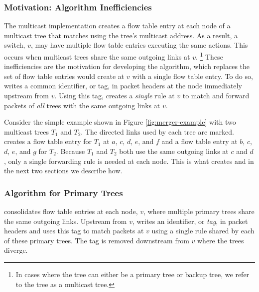 \subsubsection{Motivation: \basen Algorithm Inefficiencies}
\label{subsubsec:merge-motivate}

The \base multicast implementation creates a flow table entry at each node of a multicast tree that matches using the tree's multicast address. 
As a result, a switch, $v$, may have multiple flow table entries executing the same actions.  This occurs when multicast trees share the same outgoing links at $v$. 
\footnote{In cases where the tree can either be a primary tree or backup tree, we refer to the tree as a multicast tree.}
These inefficiencies are the motivation for developing the \merge algorithm, which replaces the set of flow table entries \base would create at $v$ with a single flow table entry. 
To do so, \merge writes a common identifier, or tag, in packet headers at the node immediately upstream from $v$. Using this tag, \merge creates a \emph{single} rule at $v$ to match and 
forward packets of \emph{all} trees with the same outgoing links at $v$.

Consider the simple example shown in Figure \ref{fig:merger-example} with two multicast trees $T_1$ and $T_2$. The directed links used by each tree are marked.
\base creates a flow table entry for $T_1$ at $a$, $c$, $d$, $e$, and $f$ and a flow table entry at $b$, $c$, $d$, $e$, and $g$ for $T_2$.  Because 
$T_1$ and $T_2$ both use the same outgoing links at $c$ and $d$, only a single forwarding rule is needed at each node.  This is what \merge creates and in the next two sections we describe how.





\subsubsection{\mergen Algorithm for Primary Trees}
\label{subsubsec:merge-primary}


\merge consolidates flow table entries at each node, $v$, where multiple primary trees share the same outgoing links. 
Upstream from $v$, \merge writes an identifier, or \emph{tag}, in packet headers and uses this tag to match packets at $v$ using a single rule shared by each of these primary trees.
The tag is removed downstream from $v$ where the trees diverge. 

